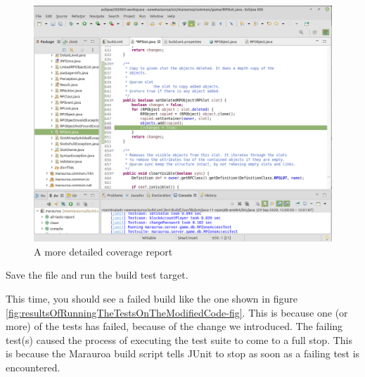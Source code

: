 \documentclass[
]{book}
\begin{document}
\begin{figure}

{\centering \includegraphics[width=1\linewidth]{images/3.4.1commentOutALineOfCode} 

}

\caption{A more detailed coverage report}\label{fig:commentOutALineOfCode-fig}
\end{figure}

Save the file and run the build test target.

This time, you should see a failed build like the one shown in figure \ref{fig:resultsOfRunningTheTestsOnTheModifiedCode-fig}. This is because one (or more) of the tests has failed, because of the change we introduced. The failing test(s) caused the process of executing the test suite to come to a full stop. This is because the Marauroa build script tells JUnit to stop as soon as a failing test is encountered.
\end{document}
